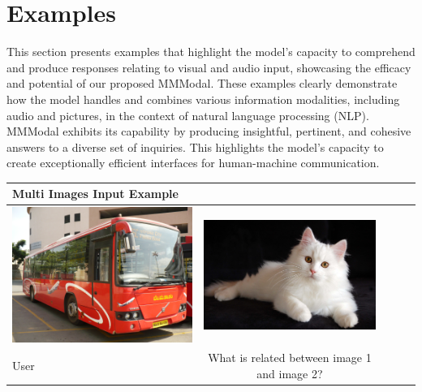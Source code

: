 \documentclass[preprint]{article}
\begin{document}
\section{Examples}

This section presents examples that highlight the model's capacity to comprehend and produce responses relating to visual and audio input, showcasing the efficacy and potential of our proposed MMModal. These examples clearly demonstrate how the model handles and combines various information modalities, including audio and pictures, in the context of natural language processing (NLP). MMModal exhibits its capability by producing insightful, pertinent, and cohesive answers to a diverse set of inquiries. This highlights the model's capacity to create exceptionally efficient interfaces for human-machine communication.

\begin{table}[hbt!]
  \setlength{\extrarowheight}{3pt} %
  \renewcommand{\arraystretch}{1.5} %
  \begin{tabular}{lcccl}
    \hline
    \textbf{Multi Images Input Example}                                                                                                                    \\[6pt]  %
    \hline
    \hline
    \includegraphics[width=0.45\linewidth,keepaspectratio]{pic/R.jpeg} & \includegraphics[width=0.45\linewidth,keepaspectratio]{pic/Persian-cat-breed.jpg} \\
    User                                                               & What is related between image 1 and image 2?                                      \\
    \hline
  \end{tabular}
\end{table}
\end{document}
